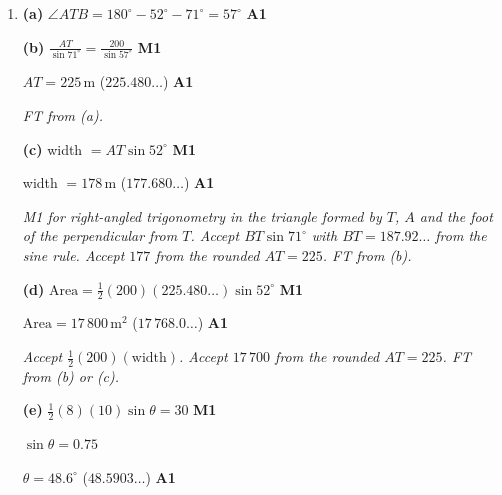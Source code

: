 \documentclass[12pt, twoside]{article}
\begin{document}
\begin{enumerate}[itemsep=0.3cm]
\newpage

\item[2.] [Maximum mark: 9]

\textbf{(a)} $\angle ATB = 180^\circ - 52^\circ - 71^\circ = 57^\circ$ \hfill \textbf{A1}

\textbf{(b)} $\frac{AT}{\sin 71^\circ} = \frac{200}{\sin 57^\circ}$ \hfill \textbf{M1}

$AT = 225\,\text{m}$ \quad ($225.480\ldots$) \hfill \textbf{A1}

\emph{FT from (a).}

\textbf{(c)} width $= AT \sin 52^\circ$ \hfill \textbf{M1}

width $= 178\,\text{m}$ \quad ($177.680\ldots$) \hfill \textbf{A1}

\emph{M1 for right-angled trigonometry in the triangle formed by $T$, $A$
and the foot of the perpendicular from $T$. Accept $BT \sin 71^\circ$ with
$BT = 187.92\ldots$ from the sine rule. Accept $177$ from the rounded
$AT = 225$. FT from (b).}

\textbf{(d)} $\text{Area} = \frac{1}{2}(200)(225.480\ldots)\sin 52^\circ$ \hfill \textbf{M1}

$\text{Area} = 17\,800\,\text{m}^{2}$ \quad ($17\,768.0\ldots$) \hfill \textbf{A1}

\emph{Accept $\frac{1}{2}(200)(\text{width})$. Accept $17\,700$ from the
rounded $AT = 225$. FT from (b) or (c).}

\textbf{(e)} $\frac{1}{2}(8)(10)\sin\theta = 30$ \hfill \textbf{M1}

$\sin\theta = 0.75$

$\theta = 48.6^\circ$ \quad ($48.5903\ldots$) \hfill \textbf{A1}

\end{enumerate}
\end{document}
